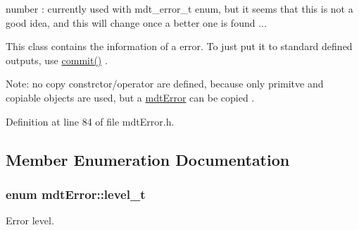 number \-: currently used with mdt\-\_\-error\-\_\-t enum, but it seems that this is not a good idea, and this will change once a better one is found ...

This class contains the information of a error. To just put it to standard defined outputs, use \hyperlink{classmdt_error_ad3cccf7c7f7d4bdabdcb4e60794bb9cb}{commit()} .

Note\-: no copy constrctor/operator are defined, because only primitve and copiable objects are used, but a \hyperlink{classmdt_error}{mdt\-Error} can be copied . 

Definition at line 84 of file mdt\-Error.\-h.



\subsection{Member Enumeration Documentation}
\hypertarget{classmdt_error_a5c8b1a040e2feaa848f6201d6b6f0cd7}{
\subsubsection[{level\-\_\-t}]{\setlength{\rightskip}{0pt plus 5cm}enum {\bf mdt\-Error\-::level\-\_\-t}}}\label{classmdt_error_a5c8b1a040e2feaa848f6201d6b6f0cd7}


Error level. 

